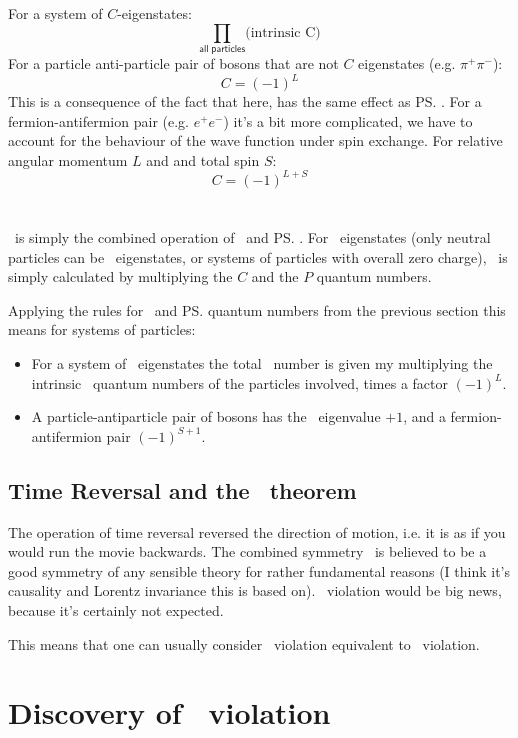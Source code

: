 For a system of $C$-eigenstates:
\[
\prod\limits_{\mathsf{all\;particles}}
\mbox{(intrinsic C)}
\]
For a particle anti-particle pair of bosons that are not $C$
eigenstates (e.g. $\pi^+\pi^-$):
\[
C = (-1)^L
\]
This is a consequence of the fact that here, \cs has the same effect as \ps.
For a fermion-antifermion pair (e.g. $e^+ e^-$) it's a bit more complicated, we have to account for the behaviour of the wave function under spin exchange. For relative angular momentum $L$ and and total spin $S$:
\[
C = (-1)^{L+S}
\]



\section{\cp}
\label{sec:CPV_CP}
 \cp\ is simply the combined operation of \cs\ and \ps.
 For \cp\ eigenstates (only neutral particles can be \cp\ eigenstates, or
 systems of particles with overall zero charge), \cp\ is simply
 calculated by multiplying the $C$ and the $P$ quantum numbers.

 Applying the rules for \cs\ and \ps quantum numbers from the
 previous section this means for systems of particles:
\begin{itemize}
\item For a system of \cp\ eigenstates the total \cp\ number is given my
  multiplying the intrinsic \cp\ quantum numbers of the particles
  involved, times a factor $(-1)^L$.
\item A particle-antiparticle pair of bosons has the \cp\ eigenvalue
  $+1$, and a fermion-antifermion pair $(-1)^{S+1}$.
\end{itemize}


\subsection{Time Reversal and the \cpt\ theorem}
 The operation of time reversal reversed the direction of motion,
 i.e. it is as if you would run the movie backwards. The combined
 symmetry \cpt\ is believed to be a good symmetry of any sensible theory
 for rather fundamental reasons (I think it's causality and Lorentz
 invariance this is based on). \cpt\ violation would be big news,
 because it's certainly not expected.

 This means that one can usually consider \cp\ violation equivalent to
 \ts\ violation.

\section{Discovery of \cp\ violation}


